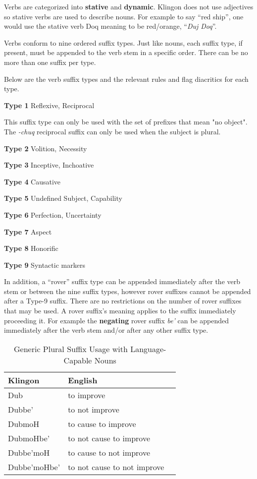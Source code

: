 \documentclass[11pt]{article}
\begin{document}
Verbs are categorized into \textbf{stative} and \textbf{dynamic}. Klingon does not use adjectives so stative verbs are used to describe nouns. For example to say ``red ship'', one would use the stative verb Doq meaning to be red/orange, ``\textit{Duj Doq}''.

Verbs conform to nine ordered suffix types. Just like nouns, each suffix type, if present, must be appended to the verb stem in a specific order. There can be no more than one suffix per type.

Below are the verb suffix types and the relevant rules and flag diacritics for each type.

	\textbf{Type 1} Reflexive, Reciprocal
	
	This suffix type can only be used with the set of prefixes that mean "no object". The \textit{-chuq} reciprocal suffix can only be used when the subject is plural.
	
	\textbf{Type 2} Volition, Necessity

	\textbf{Type 3} Inceptive, Inchoative

	\textbf{Type 4} Causative

	\textbf{Type 5} Undefined Subject, Capability

	\textbf{Type 6} Perfection, Uncertainty

	\textbf{Type 7} Aspect

	\textbf{Type 8} Honorific

	\textbf{Type 9} Syntactic markers

In addition, a ``rover'' suffix type can be appended immediately after the verb stem or between the nine suffix types, however rover suffixes cannot be appended after a Type-9 suffix. There are no restrictions on the number of rover suffixes that may be used. A rover suffix's meaning applies to the suffix immediately proceeding it. For example the \textbf{negating} rover suffix \textit{be'} can be appended immediately after the verb stem and/or after any other suffix type.

	\begin{table}[h]
	\begin{center}
	\begin{tabular}{lll}
	\toprule
	\bf Klingon & \bf English \\
	\midrule
	Dub & to improve \\
	Dubbe' & to not improve \\
	DubmoH & to cause to improve \\
	DubmoHbe' & to not cause to improve \\
	Dubbe'moH & to cause to not improve \\
	Dubbe'moHbe' & to not cause to not improve \\
	\bottomrule
	\end{tabular}
	\end{center}
	\caption{Generic Plural Suffix Usage with Language-Capable Nouns}
	\end{table}
\end{document}
